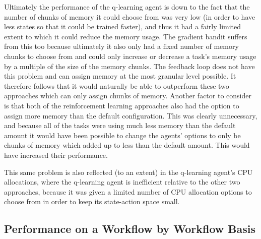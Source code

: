 Ultimately the performance of the q-learning agent is down to the fact that the number of chunks of memory it could choose from was very low (in order to have less states so that it could be trained faster), and thus it had a fairly limited extent to which it could reduce the memory usage. The gradient bandit suffers from this too because ultimately it also only had a fixed number of memory chunks to choose from and could only increase or decrease a task’s memory usage by a multiple of the size of the memory chunks. The feedback loop does not have this problem and can assign memory at the most granular level possible. It therefore follows that it would naturally be able to outperform these two approaches which can only assign chunks of memory. Another factor to consider is that both of the reinforcement learning approaches also had the option to assign more memory than the default configuration. This was clearly unnecessary, and because all of the tasks were using much less memory than the default amount it would have been possible to change the agents’ options to only be chunks of memory which added up to less than the default amount. This would have increased their performance. 

This same problem is also reflected (to an extent) in the q-learning agent’s CPU allocations, where the q-learning agent is inefficient relative to the other two approaches, because it was given a limited number of CPU allocation options to choose from in order to keep its state-action space small. 

\subsection{Performance on a Workflow by Workflow Basis}
\label{sub:per_wf}


